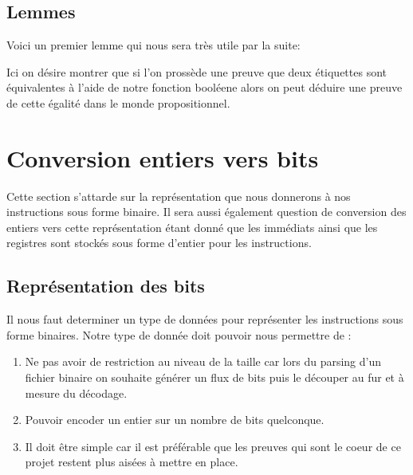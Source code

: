 \documentclass {article}
\newcommand{\codefrom}[3]
           {}
\theoremstyle{definition}
\theoremstyle{remark}
\begin{document}
\codefrom{rapport}{definitions}{SchemeEqual}



\subsection{Lemmes}
\label{LemmesAST}
Voici un premier lemme qui nous sera très utile par la suite:
\codefrom{src}{ast_instructions}{tag_beq_different}
Ici on désire montrer que si l'on prossède une preuve que deux étiquettes sont équivalentes
à l'aide de notre fonction booléene alors on peut déduire une preuve
de cette égalité dans le monde propositionnel.








\section{Conversion entiers vers bits}
\label{Section Conversion N liste B}

Cette section s'attarde sur la représentation que nous donnerons à nos instructions
sous forme binaire. Il sera aussi également question de conversion des entiers vers cette
représentation étant donné que les immédiats ainsi que les registres sont stockés sous forme d'entier
pour les instructions.



\subsection{Représentation des bits}


Il nous faut determiner un type de données pour représenter
les instructions sous forme binaires.
Notre type de donnée doit pouvoir nous permettre de :
\begin{enumerate}
\item Ne pas avoir de restriction au niveau de la taille car lors du parsing d'un fichier binaire
  on souhaite générer un flux de bits puis le découper au fur et à mesure du décodage.
\item Pouvoir encoder un entier sur un nombre de bits quelconque.
\item Il doit être simple car il est préférable que les preuves qui sont le coeur de ce projet restent
  plus aisées à mettre en place.
\end{enumerate}
\end{document}
